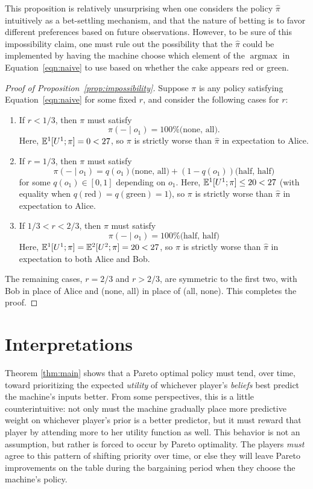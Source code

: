 \documentclass{article}  %
\newcommand{\eqn}[1]{Equation~\ref{eqn:#1}}
\newcommand{\prop}[1]{Proposition~\ref{prop:#1}}
\DeclareMathOperator*{\argmax}{argmax}
\begin{document}
This proposition is relatively unsurprising when one considers the policy $\hat\pi$ intuitively as a bet-settling mechanism, and that the nature of betting is to favor different preferences based on future observations.  However, to be sure of this impossibility claim, one must rule out the possibility that the $\hat\pi$ could be implemented by having the machine choose which element of the $\argmax$ in \eqn{naive} to use based on whether the cake appears red or green.  

\begin{proof}[Proof of \prop{impossibility}] Suppose $\pi$ is any policy satisfying \eqn{naive} for some fixed $r$, and consider the following cases for $r$:
\begin{enumerate}
\item If $r < 1/3 $, then $\pi$ must satisfy
\[
\pi(-\mid o_1) = 100\%\text{(none, all)}.
\] 
Here, $\mathbb{E}^1[U^1 ; \pi] = 0 < 27$, so $\pi$ is strictly worse than $\hat\pi$ in expectation to Alice.

\item If $r = 1/3 $, then $\pi$ must satisfy
\[
\pi(-\mid o_1) = q(o_1)\text{(none, all)} + (1-q(o_1))\text{(half, half)}
\] 
for some $q(o_1)\in[0,1]$ depending on $o_1$.  Here, $\mathbb{E}^1[U^1 ; \pi] \le 20 < 27$ (with equality when $q(\text{red})=q(\text{green})=1$), so $\pi$ is strictly worse than $\hat\pi$ in expectation to Alice.

\item If $1/3 < r < 2/3 $, then $\pi$ must satisfy
\[
\pi(-\mid o_1)=100\%\text{(half, half)}
\]
Here, $\mathbb{E}^1[U^1 ; \pi] = \mathbb{E}^2[U^2 ; \pi] = 20 < 27$, so $\pi$ is strictly worse than $\hat\pi$ in expectation to both Alice and Bob.
\end{enumerate}
The remaining cases, $r=2/3$ and  $r>2/3$, are symmetric to the first two, with Bob in place of Alice and (none, all) in place of (all, none).  This completes the proof.
\end{proof}

\section{Interpretations}

Theorem \ref{thm:main} shows that a Pareto optimal policy must tend, over time, toward prioritizing the expected {\em utility} of whichever player's \emph{beliefs} best predict the machine's inputs better.  From some perspectives, this is a little counterintuitive: not only must the machine gradually place more predictive weight on whichever player's prior is a better predictor, but it must reward that player by attending more to her utility function as well.  This behavior is not an assumption, but rather is forced to occur by Pareto optimality.  The players \emph{must} agree to this pattern of shifting priority over time, or else they will leave Pareto improvements on the table during the bargaining period when they choose the machine's policy.  
\end{document}

